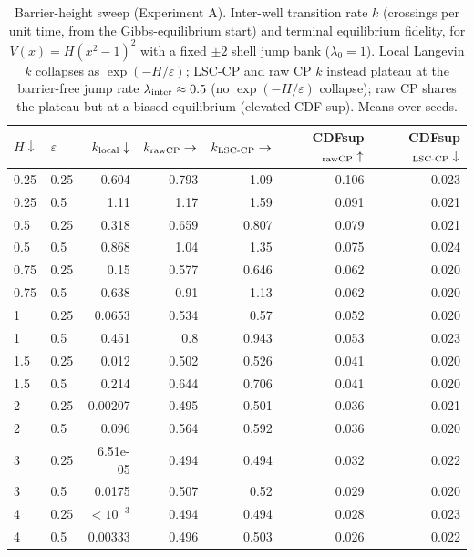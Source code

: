 \begin{table}[t]
\centering
\small
\caption{Barrier-height sweep (Experiment A). Inter-well transition rate $k$ (crossings per unit time, from the Gibbs-equilibrium start) and terminal equilibrium fidelity, for $V(x)=H(x^2-1)^2$ with a fixed $\pm2$ shell jump bank ($\lambda_0=1$). Local Langevin $k$ collapses as $\exp(-H/\varepsilon)$; LSC-CP and raw CP $k$ instead plateau at the barrier-free jump rate $\lambda_{\rm inter}\approx0.5$ (no $\exp(-H/\varepsilon)$ collapse); raw CP shares the plateau but at a biased equilibrium (elevated CDF-sup). Means over seeds.}
\label{tab:barrier-sweep}
\begin{tabular}{llrrrrr}
\toprule
$H\downarrow$ & $\varepsilon$ & $k_{\rm local}\downarrow$ & $k_{\rm rawCP}\to$ & $k_{\rm LSC\text{-}CP}\to$ & CDFsup$_{\rm rawCP}\uparrow$ & CDFsup$_{\rm LSC\text{-}CP}\downarrow$ \\
\midrule
0.25 & 0.25 & 0.604 & 0.793 & 1.09 & 0.106 & 0.023 \\
0.25 & 0.5 & 1.11 & 1.17 & 1.59 & 0.091 & 0.021 \\
0.5 & 0.25 & 0.318 & 0.659 & 0.807 & 0.079 & 0.021 \\
0.5 & 0.5 & 0.868 & 1.04 & 1.35 & 0.075 & 0.024 \\
0.75 & 0.25 & 0.15 & 0.577 & 0.646 & 0.062 & 0.020 \\
0.75 & 0.5 & 0.638 & 0.91 & 1.13 & 0.062 & 0.020 \\
1 & 0.25 & 0.0653 & 0.534 & 0.57 & 0.052 & 0.020 \\
1 & 0.5 & 0.451 & 0.8 & 0.943 & 0.053 & 0.023 \\
1.5 & 0.25 & 0.012 & 0.502 & 0.526 & 0.041 & 0.020 \\
1.5 & 0.5 & 0.214 & 0.644 & 0.706 & 0.041 & 0.020 \\
2 & 0.25 & 0.00207 & 0.495 & 0.501 & 0.036 & 0.021 \\
2 & 0.5 & 0.096 & 0.564 & 0.592 & 0.036 & 0.020 \\
3 & 0.25 & 6.51e-05 & 0.494 & 0.494 & 0.032 & 0.022 \\
3 & 0.5 & 0.0175 & 0.507 & 0.52 & 0.029 & 0.020 \\
4 & 0.25 & $<10^{-3}$ & 0.494 & 0.494 & 0.028 & 0.023 \\
4 & 0.5 & 0.00333 & 0.496 & 0.503 & 0.026 & 0.022 \\
\bottomrule
\end{tabular}
\end{table}
